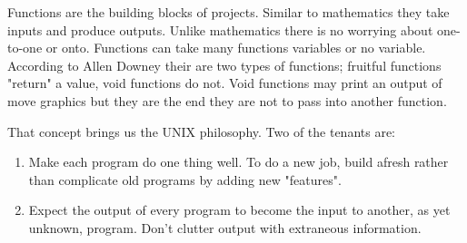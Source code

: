 \documentclass[../main.tex]{subfiles}
\begin{document}
Functions are the building blocks of projects. Similar to mathematics they take inputs and produce outputs. Unlike mathematics there is no worrying about one-to-one or onto. Functions can take many functions variables or no variable. According to Allen Downey their are two types of functions; fruitful functions "return" a value, void functions do not. Void functions may print an output of move graphics but they are the end they are not to pass into another function.

That concept brings us the UNIX philosophy. Two of the tenants are:
\begin{enumerate}
    \item Make each program do one thing well. To do a new job, build afresh rather than complicate old programs by adding new "features".
    \item Expect the output of every program to become the input to another, as yet unknown, program. Don't clutter output with extraneous information.
\end{enumerate}
\end{document}
